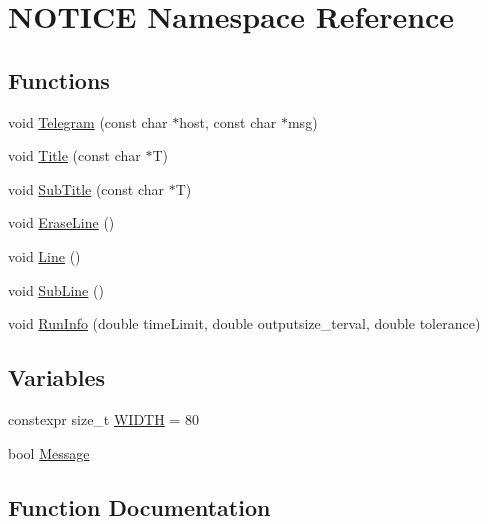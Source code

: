 \hypertarget{namespace_n_o_t_i_c_e}{}\section{N\+O\+T\+I\+CE Namespace Reference}
\label{namespace_n_o_t_i_c_e}
\subsection*{Functions}
\begin{DoxyCompactItemize}
\item 
void \mbox{\hyperlink{namespace_n_o_t_i_c_e_a7f45e7bbaeb797160d77c7c5dbbb37a6}{Telegram}} (const char $\ast$host, const char $\ast$msg)
\item 
void \mbox{\hyperlink{namespace_n_o_t_i_c_e_a0ddfb0ca7dfa968616d34f4752368bba}{Title}} (const char $\ast$T)
\item 
void \mbox{\hyperlink{namespace_n_o_t_i_c_e_a483b62c015a4211e2716f730ad2c0a44}{Sub\+Title}} (const char $\ast$T)
\item 
void \mbox{\hyperlink{namespace_n_o_t_i_c_e_a46fcf4944d7c1d3cc4d821297b0e4bf8}{Erase\+Line}} ()
\item 
void \mbox{\hyperlink{namespace_n_o_t_i_c_e_a9536e3b7bb1f9b6af83b1a5cdf3a56d3}{Line}} ()
\item 
void \mbox{\hyperlink{namespace_n_o_t_i_c_e_a782778073f9df89a3d20a7faa16494aa}{Sub\+Line}} ()
\item 
void \mbox{\hyperlink{namespace_n_o_t_i_c_e_ab85b7138c5f1deaeeedad94b7bad2477}{Run\+Info}} (double time\+Limit, double outputsize\+\_\+terval, double tolerance)
\end{DoxyCompactItemize}
\subsection*{Variables}
\begin{DoxyCompactItemize}
\item 
constexpr size\+\_\+t \mbox{\hyperlink{namespace_n_o_t_i_c_e_a31f6fb221f22faf96b9cfb05315d1d3e}{W\+I\+D\+TH}} = 80
\item 
bool \mbox{\hyperlink{namespace_n_o_t_i_c_e_a4de9d52506c4de1641e95f4f53669e3f}{Message}}
\end{DoxyCompactItemize}


\subsection{Function Documentation}
\mbox{\label{namespace_n_o_t_i_c_e_a46fcf4944d7c1d3cc4d821297b0e4bf8}} 
